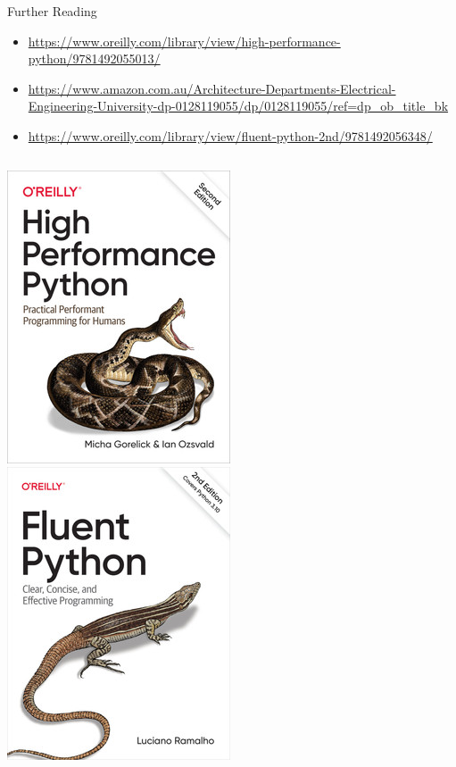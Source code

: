 \documentclass[12pt, aspectration=169]{beamer}
\begin{document}
    \begin{frame}{Further Reading}
        \begin{itemize}
            \item \url{https://www.oreilly.com/library/view/high-performance-python/9781492055013/}
            \item \url{https://www.amazon.com.au/Architecture-Departments-Electrical-Engineering-University-dp-0128119055/dp/0128119055/ref=dp_ob_title_bk}
            \item \url{https://www.oreilly.com/library/view/fluent-python-2nd/9781492056348/}
        \end{itemize}
        \begin{center}
            \begin{columns}
                \includegraphics[scale=0.35]{static/images/HighPerformancePython2ndEdition}
                \includegraphics[scale=0.35]{static/images/FluentPython2ndEdition}

\end{columns}
\end{center}
\end{frame}
\end{document}
